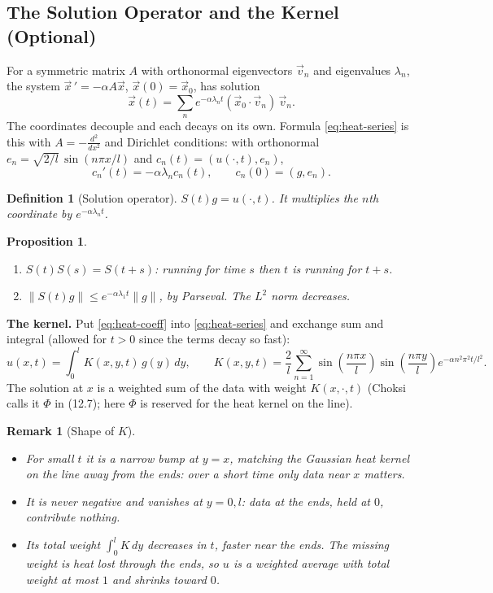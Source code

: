 \documentclass{article}
\newtheorem{definition}{Definition}
\newtheorem{remark}{Remark}
\newtheorem{proposition}{Proposition}
\begin{document}
\subsection{The Solution Operator and the Kernel (Optional)}
For a symmetric matrix $A$ with orthonormal eigenvectors $\vec{v}_n$ and eigenvalues $\lambda_n$, the system $\vec{x}\,' = -\alpha A\vec{x}$, $\vec{x}(0) = \vec{x}_0$, has solution
\begin{equation}
    \vec{x}(t) = \sum_n e^{-\alpha\lambda_nt}(\vec{x}_0\cdot\vec{v}_n)\,\vec{v}_n.
\end{equation}
The coordinates decouple and each decays on its own. Formula \eqref{eq:heat-series} is this with $A = -\frac{d^2}{dx^2}$ and Dirichlet conditions: with orthonormal $e_n = \sqrt{2/l}\,\sin(n\pi x/l)$ and $c_n(t) = (u(\cdot,t), e_n)$,
\begin{equation}
    c_n'(t) = -\alpha\lambda_nc_n(t), \qquad c_n(0) = (g, e_n).
\end{equation}
\begin{definition}[Solution operator]
    $S(t)g = u(\cdot,t)$. It multiplies the $n$th coordinate by $e^{-\alpha\lambda_nt}$.
\end{definition}
\begin{proposition}
    \leavevmode
    \begin{enumerate}[label=(\arabic*)]
        \item $S(t)S(s) = S(t+s)$: running for time $s$ then $t$ is running for $t + s$.
        \item $\|S(t)g\| \leq e^{-\alpha\lambda_1t}\|g\|$, by Parseval. The $L^2$ norm decreases.
    \end{enumerate}
\end{proposition}
\textbf{The kernel.} Put \eqref{eq:heat-coeff} into \eqref{eq:heat-series} and exchange sum and integral (allowed for $t > 0$ since the terms decay so fast):
\begin{equation}
    u(x,t) = \int_0^l K(x,y,t)\,g(y)\,dy, \qquad K(x,y,t) = \frac2l\sum_{n=1}^\infty\sin\left(\frac{n\pi x}{l}\right)\sin\left(\frac{n\pi y}{l}\right)e^{-\alpha n^2\pi^2t/l^2}.
\end{equation}
The solution at $x$ is a weighted sum of the data with weight $K(x,\cdot,t)$ (Choksi calls it $\Phi$ in (12.7); here $\Phi$ is reserved for the heat kernel on the line).
\begin{remark}[Shape of $K$]
    \leavevmode
    \begin{itemize}
        \item For small $t$ it is a narrow bump at $y = x$, matching the Gaussian heat kernel on the line away from the ends: over a short time only data near $x$ matters.
        \item It is never negative and vanishes at $y = 0, l$: data at the ends, held at $0$, contribute nothing.
        \item Its total weight $\int_0^lK\,dy$ decreases in $t$, faster near the ends. The missing weight is heat lost through the ends, so $u$ is a weighted average with total weight at most $1$ and shrinks toward $0$.
    \end{itemize}
\end{remark}
\end{document}
